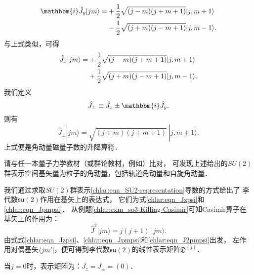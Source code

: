 \begin{align}
    \mathbbm{i}\hat{J}_y|jm\rangle =&+ \frac{1}{2}\sqrt{(j-m)(j+m+1)}|j,m+1\rangle \notag \\
    &-\frac{1}{2}\sqrt{ (j+m) (j-m+1)} |j,m-1\rangle.
\end{align}
与上式类似，可得
\begin{align}
    \hat{J}_x|jm\rangle =&+ \frac{1}{2}\sqrt{(j-m)(j+m+1)}|j,m+1\rangle \notag \\
    &+\frac{1}{2}\sqrt{ (j+m) (j-m+1)} |j,m-1\rangle. \label{chlar:eqn_Jx}
\end{align}
我们定义
\begin{equation}
    \hat{J}_{\pm} \equiv \hat{J}_x \pm \mathbbm{i}\hat{J}_y.
\end{equation}
则有
\begin{equation}\label{chlar:eqn_Jpmpsi}
    \hat{J}_{\pm} |jm\rangle = \sqrt{(j\mp m)(j\pm m+1)} \  |j,m\pm 1\rangle .
\end{equation}
上式便是角动量磁量子数的升降算符．

请与任一本量子力学教材（或群论教材，例如\parencite[\S 11.5]{taorb-2011-gt}）比对，
可发现上述给出的$SU(2)$群表示空间基矢量为粒子的角动量，包括轨道角动量和自旋角动量．


我们通过求取$SU(2)$群表示\eqref{chlar:eqn_SU2-representation}导数的方式给出了
李代数$\mathfrak{su}(2)$作用在基矢上的表达式，
它们为式\eqref{chlar:eqn_Jzpsi}和\eqref{chlar:eqn_Jpmpsi}．
从例题\ref{chlar:exm_so3-Killing-Casimir}可知Casimir算子在基矢上的作用为：
\begin{equation}\label{chlar:eqn_J2pmpsi}
    \hat{J}^2 |jm\rangle = j(j+1) \  |jm\rangle .
\end{equation}
由式式\eqref{chlar:eqn_Jzpsi}、\eqref{chlar:eqn_Jpmpsi}和\eqref{chlar:eqn_J2pmpsi}出发，
左作用对偶基矢$\langle jm'|$，便可得到李代数$\mathfrak{su}(2)$的线性表示矩阵$\mathfrak{D}^{(j)}$．


\noindent  当$j=0$时，表示矩阵为：$J_z=J_{\pm}=(0)$．

